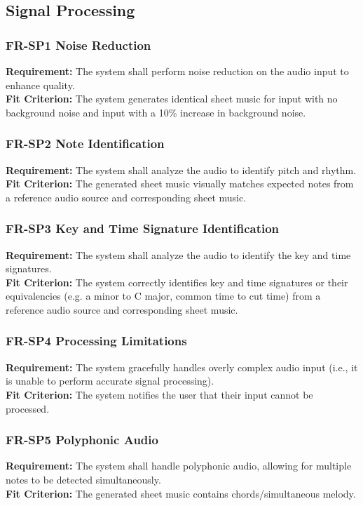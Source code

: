 \documentclass[12pt]{article}
\begin{document}
\subsection{Signal Processing}
\subsubsection*{FR-SP1 Noise Reduction}
\textbf{Requirement:} The system shall perform noise reduction on the audio input to enhance quality. \\
\textbf{Fit Criterion:} The system generates identical sheet music for input with no background noise and input with a 10\% increase in background noise.
\subsubsection*{FR-SP2 Note Identification}
\textbf{Requirement:} The system shall analyze the audio to identify pitch and rhythm. \\
\textbf{Fit Criterion:} The generated sheet music visually matches expected notes from a reference audio source and corresponding sheet music.
\subsubsection*{FR-SP3 Key and Time Signature Identification}
\textbf{Requirement:}	The system shall analyze the audio to identify the key and time signatures. \\
\textbf{Fit Criterion:} The system correctly identifies key and time signatures or their equivalencies (e.g. a minor to C major, common time to cut time) from a reference audio source and corresponding sheet music.
\subsubsection*{FR-SP4 Processing Limitations}
\textbf{Requirement:} The system gracefully handles overly complex audio input (i.e., it is unable to perform accurate signal processing). \\
\textbf{Fit Criterion:} The system notifies the user that their input cannot be processed.
\subsubsection*{FR-SP5 Polyphonic Audio}
\textbf{Requirement:} The system shall handle polyphonic audio, allowing for multiple notes to be detected simultaneously. \\
\textbf{Fit Criterion:} The generated sheet music contains chords/simultaneous melody.
\end{document}
